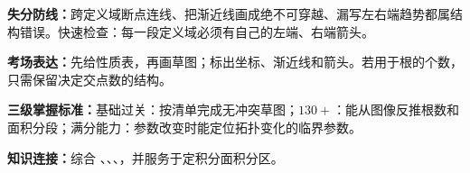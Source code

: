 \begin{knowledgeBox}
\textbf{失分防线：}跨定义域断点连线、把渐近线画成绝不可穿越、漏写左右端趋势都属结构错误。快速检查：每一段定义域必须有自己的左端、右端箭头。

\textbf{考场表达：}先给性质表，再画草图；标出坐标、渐近线和箭头。若用于根的个数，只需保留决定交点数的结构。

\textbf{三级掌握标准：}基础过关：按清单完成无冲突草图；\(130+\)：能从图像反推根数和面积分段；满分能力：参数改变时能定位拓扑变化的临界参数。

\textbf{知识连接：}综合 、、、，并服务于定积分面积分区。
\end{knowledgeBox}


\par

